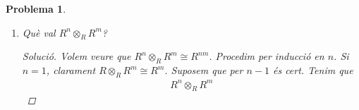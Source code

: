 \documentclass[compress]{article}
\newtheorem{problema}{Problema}
\theoremstyle{definition}
\begin{document}
\begin{problema}
\begin{enumerate}
\begin{proof}
             \begin{equation*}
            \begin{tikzcd}
                (M\otimes_{R}N)\times L
                \arrow[hook]{d}
                &M\otimes_{R}N
                \arrow[hook]{l}
                &M\times N
                \arrow{l}
                \arrow[hook]{d}
                &M
                \arrow[hook]{d}
                \arrow[hook]{rr}
                &&M\times(N\otimes_{R}L)
                \arrow[hook]{d}\\
                (M\otimes_{R}N)\otimes_{R}L
                \arrow[crossing over, dotted, bend left=30]{rrrrr}{\exists!\overline{(-\otimes_{R}(-\otimes_{R}-))\circ\alpha}}
                &&(M\times N)\times L
                \arrow[shift left]{r}{\alpha}
                \arrow[dotted, swap]{ll}{((-\otimes_{R}-)\otimes_{R}-)}
                &M\times(N\times L)
                \arrow[shift left]{l}{\beta}
                \arrow[dotted]{rr}{(-\otimes_{R}(-\otimes_{R}-))}
                &&M\otimes_{R}(N\otimes_{R}L)
                \arrow[crossing over, dotted, bend left=30]{lllll}{\exists!\overline{((-\otimes_{R}-)\otimes_{R}-)\circ\beta}}
                \\
                (M\otimes_{R}N)\times L
                \arrow[hook]{u}
                &&L
                \arrow[hook]{u}
                \arrow[hook]{ll}
                &N\times L
                \arrow{r}
                \arrow[hook]{u}
                &N\otimes_{R}L
                \arrow[hook]{r}
                &M\times(N\otimes_{R}L)
                \arrow[hook]{u}
            \end{tikzcd}
            \end{equation*}
            on $\overline{(-\otimes_{R}(-\otimes_{R}-)\circ\alpha}((m\otimes_{R}n)\otimes_{R}l):=m\otimes_{R}(n\otimes_{R}l)$ i $\overline{((-\otimes_{R}-)\otimes_{R}-)\circ\beta}(m\otimes_{R}(n\otimes_{R}l)):=(m\otimes_{R}n)\otimes_{R}l$. D'aquí deduïm que $M\otimes_{R}(N\otimes_{R}L)\cong(M\otimes_{R}N)\otimes_{R}L$.
        \end{proof}
        \item Què val $R^{n}\otimes_{R}R^{m}$?
        \begin{proof}[Solució]
            Volem veure que $R^{n}\otimes_{R}R^{m}\cong R^{nm}$. Procedim per inducció en $n$. Si $n=1$, clarament $R\otimes_{R}R^{m}\cong R^{m}$. Suposem que per $n-1$ és cert. Tenim que
            \begin{align*}
                R^{n}\otimes_{R}R^{m}

\end{align*}
\end{proof}
\end{enumerate}
\end{problema}
\end{document}
